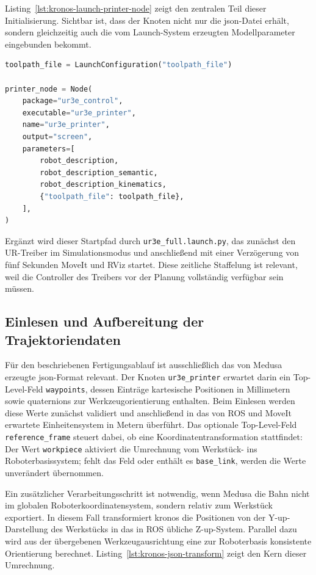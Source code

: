             Listing~\ref{lst:kronos-launch-printer-node} zeigt den zentralen Teil dieser Initialisierung.
            Sichtbar ist,
            dass der Knoten nicht nur die \gls{json}-Datei erhält,
            sondern gleichzeitig auch die vom Launch-System erzeugten Modellparameter eingebunden bekommt.

            \begin{lstlisting}[language=Python,caption={Initialisierung des Druckknotens in der Launch-Datei},label={lst:kronos-launch-printer-node}]
toolpath_file = LaunchConfiguration("toolpath_file")

printer_node = Node(
    package="ur3e_control",
    executable="ur3e_printer",
    name="ur3e_printer",
    output="screen",
    parameters=[
        robot_description,
        robot_description_semantic,
        robot_description_kinematics,
        {"toolpath_file": toolpath_file},
    ],
)
            \end{lstlisting}

            Ergänzt wird dieser Startpfad durch \texttt{ur3e\_full.launch.py},
            das zunächst den UR-Treiber im Simulationsmodus und anschließend mit einer Verzögerung von fünf Sekunden MoveIt und RViz startet.
            Diese zeitliche Staffelung ist relevant,
            weil die Controller des Treibers vor der Planung vollständig verfügbar sein müssen.

        \subsection{Einlesen und Aufbereitung der Trajektoriendaten}
            Für den beschriebenen Fertigungsablauf ist ausschließlich das von Medusa erzeugte \gls{json}-Format relevant.
            Der Knoten \texttt{ur3e\_printer} erwartet darin ein Top-Level-Feld \texttt{waypoints},
            dessen Einträge kartesische Positionen in Millimetern sowie \glspl{quaternion} zur Werkzeugorientierung enthalten.
            Beim Einlesen werden diese Werte zunächst validiert und anschließend in das von ROS und MoveIt erwartete Einheitensystem in Metern überführt.
            Das optionale Top-Level-Feld \texttt{reference\_frame} steuert dabei, ob eine Koordinatentransformation stattfindet:
            Der Wert \texttt{workpiece} aktiviert die Umrechnung vom Werkstück- ins Roboterbasissystem;
            fehlt das Feld oder enthält es \texttt{base\_link}, werden die Werte unverändert übernommen.

            Ein zusätzlicher Verarbeitungsschritt ist notwendig,
            wenn Medusa die Bahn nicht im globalen Roboterkoordinatensystem,
            sondern relativ zum Werkstück exportiert.
            In diesem Fall transformiert \ac{kronos} die Positionen von der Y-up-Darstellung des Werkstücks in das in ROS übliche Z-up-System.
            Parallel dazu wird aus der übergebenen Werkzeugausrichtung eine zur Roboterbasis konsistente Orientierung berechnet.
            Listing~\ref{lst:kronos-json-transform} zeigt den Kern dieser Umrechnung.

